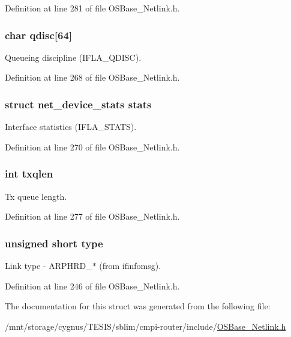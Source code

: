 Definition at line 281 of file OSBase\_\-Netlink.h.\hypertarget{structnl_link_info_a94e47ef065f1ff000d841f20ec8e197f}{
\subsubsection[{qdisc}]{\setlength{\rightskip}{0pt plus 5cm}char {\bf qdisc}\mbox{[}64\mbox{]}}}
\label{structnl_link_info_a94e47ef065f1ff000d841f20ec8e197f}
Queueing discipline (IFLA\_\-QDISC). 

Definition at line 268 of file OSBase\_\-Netlink.h.\hypertarget{structnl_link_info_a28d1784acc4686245082b95c528ae50b}{
\subsubsection[{stats}]{\setlength{\rightskip}{0pt plus 5cm}struct net\_\-device\_\-stats {\bf stats}}}
\label{structnl_link_info_a28d1784acc4686245082b95c528ae50b}
Interface statistics (IFLA\_\-STATS). 

Definition at line 270 of file OSBase\_\-Netlink.h.\hypertarget{structnl_link_info_a6c449a25cfc076fbbea4f640804e5fe1}{
\subsubsection[{txqlen}]{\setlength{\rightskip}{0pt plus 5cm}int {\bf txqlen}}}
\label{structnl_link_info_a6c449a25cfc076fbbea4f640804e5fe1}
Tx queue length. 

Definition at line 277 of file OSBase\_\-Netlink.h.\hypertarget{structnl_link_info_aa929142c5ddf34cf0915c97a617a1a63}{
\subsubsection[{type}]{\setlength{\rightskip}{0pt plus 5cm}unsigned short {\bf type}}}
\label{structnl_link_info_aa929142c5ddf34cf0915c97a617a1a63}
Link type -\/ ARPHRD\_\-$\ast$ (from ifinfomsg). 

Definition at line 246 of file OSBase\_\-Netlink.h.

The documentation for this struct was generated from the following file:\begin{DoxyCompactItemize}
\item 
/mnt/storage/cygnus/TESIS/sblim/cmpi-\/router/include/\hyperlink{_o_s_base___netlink_8h}{OSBase\_\-Netlink.h}\end{DoxyCompactItemize}
